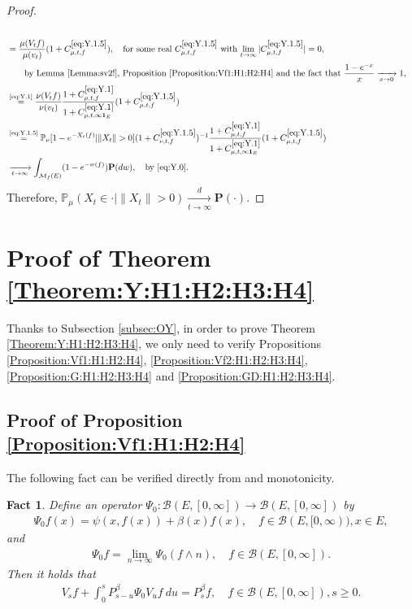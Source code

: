 \documentclass[12pt,a4paper]{amsart}
\numberwithin{equation}{section}
\theoremstyle{plain}
\newtheorem{fact}[thm]{Fact}
\theoremstyle{definition}
\theoremstyle{remark}
\newcounter{N}
\newcounter{n}[N]
\begin{document}
\begin{proof}
\begin{align}
 \\\label{eq:Y.1.5}& = \frac{ \mu(V_t f) }{ \mu(v_t) } (1+C^{\eqref{eq:Y.1.5}}_{\mu,t,f}), \quad \text{for some real $C^{\eqref{eq:Y.1.5}}_{\mu,t,f}$ with $\lim_{t\to \infty} |C^{\eqref{eq:Y.1.5}}_{\mu,t,f}| = 0$},
 \\&\qquad\text{by Lemma \ref{Lemma:sv2!}, Proposition \ref{Proposition:Vf1:H1:H2:H4} and the fact that $\frac{1-e^{-x}}{x} \xrightarrow[x\to 0]{}1$},
 \\& \overset{\text{\eqref{eq:Y.1}}}= \frac{ \nu(V_tf) }{ \nu(v_t) } \frac{1+C^{\eqref{eq:Y.1}}_{\mu,t,f}}{1+C^{\eqref{eq:Y.1}}_{\mu, t,\infty \mathbf 1_E}}(1+ C^{\eqref{eq:Y.1.5}}_{\mu,t,f}) 
 	\\& \overset{\text{\eqref{eq:Y.1.5}}}= \mathbb P_\nu [1 - e^{-X_t(f)}|\|X_t\|>0](1+C^{\eqref{eq:Y.1.5}}_{\nu, t,f})^{-1}  \frac{1+C^{\eqref{eq:Y.1}}_{\mu,t,f}}{1+C^{\eqref{eq:Y.1}}_{\mu,  t,\infty \mathbf 1_E}}(1+ C^{\eqref{eq:Y.1.5}}_{\mu,t,f})  
 	\\&\xrightarrow[t\to \infty]{} \int_{\mathcal M_f(E)}(1-e^{-w(f)}) \mathbf P(dw), \quad \text{by \eqref{eq:Y.0}}.
\end{align}
	Therefore, $\mathbb P_\mu(X_t \in \cdot | \|X_t\|>0) \xrightarrow[t\to \infty]{d} \mathbf P(\cdot).$
\end{proof}

\section{Proof of Theorem \ref{Theorem:Y:H1:H2:H3:H4}}
	Thanks to Subsection \ref{subsec:OY}, in order to prove Theorem \ref{Theorem:Y:H1:H2:H3:H4}, we only need to verify Propositions \ref{Proposition:Vf1:H1:H2:H4}, \ref{Proposition:Vf2:H1:H2:H3:H4}, \ref{Proposition:G:H1:H2:H3:H4} and \ref{Proposition:GD:H1:H2:H3:H4}. 
\subsection{Proof of Proposition \ref{Proposition:Vf1:H1:H2:H4}} \label{sec:Vf1}

	The following fact can be verified directly from \cite[Theorem 2.23]{Li2011MeasureValued} and monotonicity.
\begin{fact} \label{Fact:P!}
Define an operator $\Psi_0: \mathcal B(E, [0,\infty]) \to \mathcal B(E,[0,\infty])$ by
\begin{align}
 	\Psi_0 f(x) 
 	= \psi(x,f(x))+\beta(x)f(x), 
 	\quad f\in \mathcal B(E,[0,\infty)), x\in E,
\end{align}
	and 
\begin{align}
	\Psi_0 f 
 	= \lim_{n\to \infty} \Psi_0 (f\wedge n), \quad f\in \mathcal B(E,[0,\infty]).
\end{align}
	Then it holds that
\begin{align}\label{e:cum-FK}
 V_s f + \int_0^s P_{s-u}^\beta \Psi_0 V_{u} f ~du
 = P_s^\beta f, 
 \quad f\in \mathcal B(E,[0,\infty]), s\geq 0.
 \end{align} 
\end{fact}
\end{document}

